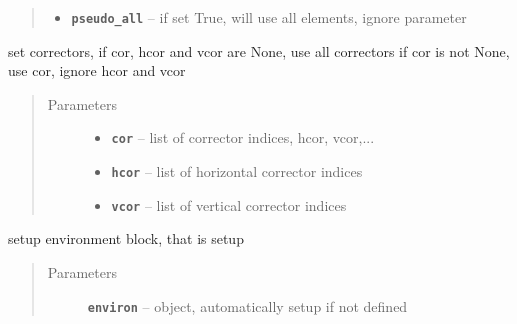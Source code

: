 \documentclass[letterpaper,10pt,english]{sphinxmanual}
\begin{document}
\begin{fulllineitems}
\begin{fulllineitems}
\begin{quote}
\begin{description}
\begin{itemize}
\item {} 
\textbf{\texttt{pseudo\_all}} -- if set True, will use all elements, ignore  parameter

\end{itemize}

\end{description}\end{quote}

\end{fulllineitems}


\begin{fulllineitems}
\label{src/apidocs/dakopt:genopt.dakopt.DakotaOC.set_cors}
set correctors, if cor, hcor and vcor are None, use all correctors
if cor is not None, use cor, ignore hcor and vcor
\begin{quote}\begin{description}
\item[{Parameters}] \leavevmode\begin{itemize}
\item {} 
\textbf{\texttt{cor}} -- list of corrector indices, hcor, vcor,...

\item {} 
\textbf{\texttt{hcor}} -- list of horizontal corrector indices

\item {} 
\textbf{\texttt{vcor}} -- list of vertical corrector indices

\end{itemize}

\end{description}\end{quote}

\end{fulllineitems}


\begin{fulllineitems}
\label{src/apidocs/dakopt:genopt.dakopt.DakotaOC.set_environ}
setup environment block, that is setup 
\begin{quote}\begin{description}
\item[{Parameters}] \leavevmode
\textbf{\texttt{environ}} --  object, automatically setup if not defined


\end{description}
\end{quote}
\end{fulllineitems}
\end{fulllineitems}
\end{document}
